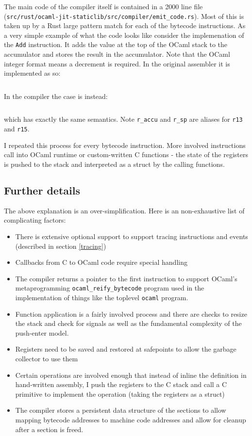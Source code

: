 The main code of the compiler itself is contained in a 2000 line file
(\texttt{src/rust/ocaml-jit-staticlib/src/compiler/emit\_code.rs}). Most of this is taken up by a
Rust large pattern match for each of the bytecode instructions. As a very simple example of what
the code looks like consider the implemenation of the \texttt{Add} instruction. It adds the value
at the top of the OCaml stack to the accumulator and stores the result in the accumulator. Note
that the OCaml integer format means a decrement is required. In the original assembler it is
implemented as so:

\inputminted{c}{snippets/add.c}

In the compiler the case is instead:

\inputminted{rust}{snippets/add.rs}

which has exactly the same semantics. Note \texttt{r\_accu} and \texttt{r\_sp}
are aliases for \texttt{r13} and \texttt{r15}.

I repeated this process for every bytecode instruction. More involved instructions call into
OCaml runtime or custom-written C functions - the state of the registers is pushed to the stack
and interpreted as a struct by the calling functions.

\subsection{Further details}

The above explanation is an over-simplification. Here is an non-exhaustive list of complicating
factors:

\begin{itemize}
    \item There is extensive optional support to support tracing instructions and events (described
          in section \ref{tracing})
    \item Callbacks from C to OCaml code require special handling
    \item The compiler returns a pointer to the first instruction to support OCaml's
          metaprogramming \texttt{ocaml\_reify\_bytecode} program used in the implementation of
          things like the
          toplevel \texttt{ocaml} program.
    \item Function application is a fairly involved process and there are checks to resize the
          stack and check for signals as well as the fundamental complexity of the push-enter
          model.
    \item Registers need to be saved and restored at safepoints to allow the garbage collector to
          use them
    \item Certain operations are involved enough that instead of inline the definition in
          hand-written assembly, I push the registers to the C stack and call a C primitive to
          implement the
          operation (taking the registers as a struct)
    \item The compiler stores a persistent data structure of the sections to allow mapping bytecode
          addresses to
          machine code addresses and allow for cleanup after a section is freed.
\end{itemize}

